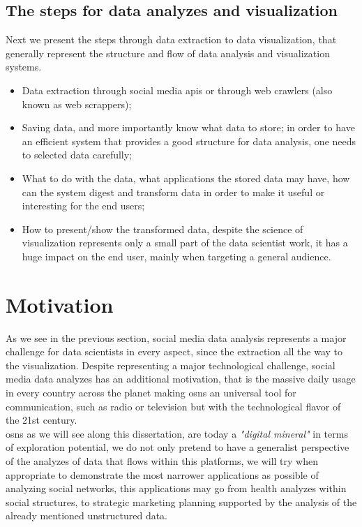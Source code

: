 \subsection*{The steps for data analyzes and visualization}

Next we present the steps through data extraction to data visualization, that generally represent the structure and flow of data analysis and visualization systems.

\begin{itemize}
\item Data extraction through social media \glspl{api} or through web crawlers (also known as web scrappers);
\item Saving data, and more importantly know what data to store; in order to have an efficient system that provides a good structure for data analysis, one needs
to selected data carefully;
\item What to do with the data, what applications the stored data may have, how can the system digest and transform data in order to make it useful or interesting for the end users;
\item How to present/show the transformed data, despite the science of visualization represents only a small part of the data scientist work, it has a huge impact on the end user, mainly when targeting a general audience.
\end{itemize}

\section{Motivation}
As we see in the previous section, social media data analysis represents a major challenge for data scientists in every aspect, since the extraction all the way to the visualization. Despite representing a major technological challenge, social media data analyzes has an additional motivation, that is the massive daily usage in every country across the planet making \glspl{osn} an universal tool for communication, such as radio or television but with the technological flavor of the 21st century.\\
\indent \glspl{osn} as we will see along this dissertation, are today a \textit{"digital mineral"} in terms of exploration potential, we do not only pretend to have a generalist perspective of the analyzes of data that flows within this platforms, we will try when appropriate to demonstrate the most narrower applications as possible of analyzing social networks, this applications may go from health analyzes within social structures, to strategic marketing planning supported by the analysis of the already mentioned unstructured data.

